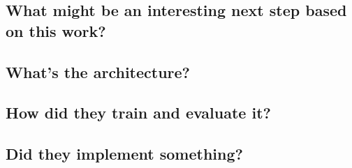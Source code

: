 \subsection{What might be an interesting next step based on this work?}

\subsection{What's the architecture?}

\subsection{How did they train and evaluate it?}

\subsection{Did they implement something?}

